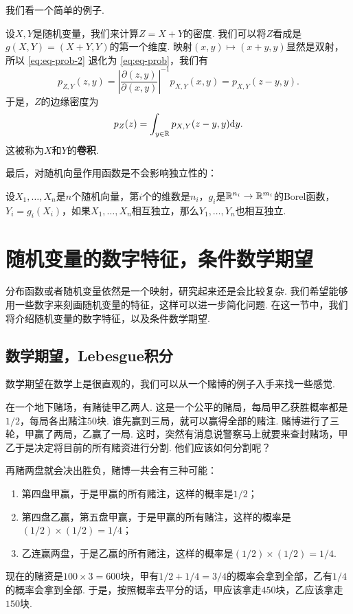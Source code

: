 我们看一个简单的例子. 

\begin{example}[卷积]
设$X,Y$是随机变量，我们来计算$Z=X+Y$的密度. 我们可以将$Z$看成是$g(X,Y)=(X+Y,Y)$的第一个维度. 映射$(x,y)\mapsto(x+y,y)$显然是双射，所以 \eqref{eq:eq-prob-2} 退化为 \eqref{eq:eq-prob}，我们有
\[p_{Z,Y}(z,y)=\left|\frac{\partial(z,y)}{\partial(x,y)}\right|^{-1}p_{X,Y}(x,y)=p_{X,Y}(z-y,y).\]
于是，$Z$的边缘密度为
\[p_Z(z)=\int_{y\in\mathbb{R}}p_{X,Y}(z-y,y)\mathrm{d} y.\]
这被称为$X$和$Y$的\textbf{卷积}. 
\end{example}

最后，对随机向量作用函数是不会影响独立性的：

\begin{proposition}\label{prop:independence-function}
设$X_1,\dots,X_n$是$n$个随机向量，第$i$个的维数是$n_i$，$g_i$是$\mathbb{R}^{n_i}\to\mathbb{R}^{m_i}$的Borel函数，$Y_i=g_i(X_i)$，如果$X_1,\dots,X_n$相互独立，那么$Y_1,\dots,Y_n$也相互独立. 
\end{proposition}

\section{随机变量的数字特征，条件数学期望}\label{sec:expectation}

分布函数或者随机变量依然是一个映射，研究起来还是会比较复杂. 我们希望能够用一些数字来刻画随机变量的特征，这样可以进一步简化问题. 在这一节中，我们将介绍随机变量的数字特征，以及条件数学期望. 

\subsection{数学期望，Lebesgue积分}

数学期望在数学上是很直观的，我们可以从一个赌博的例子入手来找一些感觉. 

\begin{example}
在一个地下赌场，有赌徒甲乙两人. 这是一个公平的赌局，每局甲乙获胜概率都是$1/2$，每局各出赌注$50$块. 谁先赢到三局，就可以赢得全部的赌注. 赌博进行了三轮，甲赢了两局，乙赢了一局. 这时，突然有消息说警察马上就要来查封赌场，甲乙于是决定将目前的所有赌资进行分割. 他们应该如何分割呢？

再赌两盘就会决出胜负，赌博一共会有三种可能：
\begin{enumerate}
    \item 第四盘甲赢，于是甲赢的所有赌注，这样的概率是$1/2$；
    \item 第四盘乙赢，第五盘甲赢，于是甲赢的所有赌注，这样的概率是$(1/2)\times(1/2)=1/4$；
    \item 乙连赢两盘，于是乙赢的所有赌注，这样的概率是$(1/2)\times(1/2)=1/4$. 
\end{enumerate}
现在的赌资是$100\times 3=600$块，甲有$1/2+1/4=3/4$的概率会拿到全部，乙有$1/4$的概率会拿到全部. 于是，按照概率去平分的话，甲应该拿走$450$块，乙应该拿走$150$块. 
\end{example}

